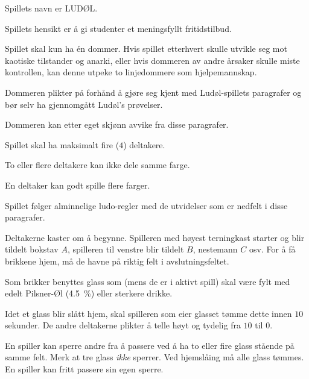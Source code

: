\begin{ludol}

\item \label{sec:ludol} Spillets navn er \textsc{LUDØL}.

\item Spillets hensikt er å gi studenter et meningsfyllt fritidstilbud.

\item Spillet skal kun ha én dommer. Hvis spillet etterhvert skulle utvikle seg
  mot kaotiske tilstander og anarki, eller hvis dommeren av andre årsaker skulle
  miste kontrollen, kan denne utpeke to linjedommere som hjelpemannskap.

\item \label{par:forkunnskaper} Dommeren plikter på forhånd å gjøre seg kjent med Ludøl-spillets
  paragrafer og bør selv ha gjennomgått Ludøl's prøvelser.

\item \label{par:dommer} Dommeren kan etter eget skjønn avvike fra disse paragrafer.

\item Spillet skal ha maksimalt fire ($4$) deltakere.

\item To eller flere deltakere kan ikke dele samme farge.

\item En deltaker kan godt spille flere farger.

\item Spillet følger alminnelige ludo-regler med de utvidelser som er nedfelt i
  disse paragrafer.

\item Deltakerne kaster om å begynne. Spilleren med høyest terningkast starter
  og blir tildelt bokstav $A$, spilleren til venstre blir tildelt $B$, nestemann
  $C$ osv. For å få brikkene hjem, må de havne på riktig felt i
  avslutningsfeltet.

\item Som brikker benyttes glass som (mens de er i aktivt spill) skal være fylt
  med edelt Pilsner-Øl (\SI{4.5}{\percent}) eller sterkere drikke.

\item Idet et glass blir slått hjem, skal spilleren som eier glasset tømme dette
  innen $10$ sekunder. De andre deltakerne plikter å telle høyt og tydelig fra
  $10$ til $0$.

\item \label{par:sperre} En spiller kan sperre andre fra å passere ved å ha to eller fire glass
  stående på samme felt. Merk at tre glass \emph{ikke} sperrer. Ved hjemslåing
  må alle glass tømmes. En spiller kan fritt passere sin egen sperre.


\end{ludol}
